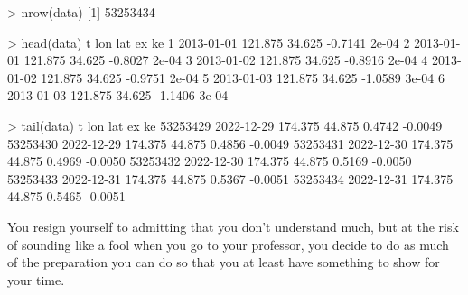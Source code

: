 \documentclass[
  10t,
]{article}
\newenvironment{Shaded}{\begin{snugshade}}{\end{snugshade}}
\newcommand{\DecValTok}[1]{\textcolor[rgb]{0.68,0.00,0.00}{#1}}
\newcommand{\FloatTok}[1]{\textcolor[rgb]{0.68,0.00,0.00}{#1}}
\newcommand{\FunctionTok}[1]{\textcolor[rgb]{0.28,0.35,0.67}{#1}}
\newcommand{\NormalTok}[1]{\textcolor[rgb]{0.00,0.23,0.31}{#1}}
\newcommand{\SpecialCharTok}[1]{\textcolor[rgb]{0.37,0.37,0.37}{#1}}
\begin{document}
\begin{Shaded}
\begin{Highlighting}[]
\SpecialCharTok{\textgreater{}} \FunctionTok{nrow}\NormalTok{(data)}
\NormalTok{[}\DecValTok{1}\NormalTok{] }\DecValTok{53253434}

\SpecialCharTok{\textgreater{}} \FunctionTok{head}\NormalTok{(data)}
\NormalTok{           t     lon    lat      ex    ke}
\DecValTok{1} \DecValTok{2013{-}01{-}01} \FloatTok{121.875} \FloatTok{34.625} \SpecialCharTok{{-}}\FloatTok{0.7141} \FloatTok{2e{-}04}
\DecValTok{2} \DecValTok{2013{-}01{-}01} \FloatTok{121.875} \FloatTok{34.625} \SpecialCharTok{{-}}\FloatTok{0.8027} \FloatTok{2e{-}04}
\DecValTok{3} \DecValTok{2013{-}01{-}02} \FloatTok{121.875} \FloatTok{34.625} \SpecialCharTok{{-}}\FloatTok{0.8916} \FloatTok{2e{-}04}
\DecValTok{4} \DecValTok{2013{-}01{-}02} \FloatTok{121.875} \FloatTok{34.625} \SpecialCharTok{{-}}\FloatTok{0.9751} \FloatTok{2e{-}04}
\DecValTok{5} \DecValTok{2013{-}01{-}03} \FloatTok{121.875} \FloatTok{34.625} \SpecialCharTok{{-}}\FloatTok{1.0589} \FloatTok{3e{-}04}
\DecValTok{6} \DecValTok{2013{-}01{-}03} \FloatTok{121.875} \FloatTok{34.625} \SpecialCharTok{{-}}\FloatTok{1.1406} \FloatTok{3e{-}04}

\SpecialCharTok{\textgreater{}} \FunctionTok{tail}\NormalTok{(data)}
\NormalTok{                  t     lon    lat     ex      ke}
\DecValTok{53253429} \DecValTok{2022{-}12{-}29} \FloatTok{174.375} \FloatTok{44.875} \FloatTok{0.4742} \SpecialCharTok{{-}}\FloatTok{0.0049}
\DecValTok{53253430} \DecValTok{2022{-}12{-}29} \FloatTok{174.375} \FloatTok{44.875} \FloatTok{0.4856} \SpecialCharTok{{-}}\FloatTok{0.0049}
\DecValTok{53253431} \DecValTok{2022{-}12{-}30} \FloatTok{174.375} \FloatTok{44.875} \FloatTok{0.4969} \SpecialCharTok{{-}}\FloatTok{0.0050}
\DecValTok{53253432} \DecValTok{2022{-}12{-}30} \FloatTok{174.375} \FloatTok{44.875} \FloatTok{0.5169} \SpecialCharTok{{-}}\FloatTok{0.0050}
\DecValTok{53253433} \DecValTok{2022{-}12{-}31} \FloatTok{174.375} \FloatTok{44.875} \FloatTok{0.5367} \SpecialCharTok{{-}}\FloatTok{0.0051}
\DecValTok{53253434} \DecValTok{2022{-}12{-}31} \FloatTok{174.375} \FloatTok{44.875} \FloatTok{0.5465} \SpecialCharTok{{-}}\FloatTok{0.0051}
\end{Highlighting}
\end{Shaded}

You resign yourself to admitting that you don't understand much, but at
the risk of sounding like a fool when you go to your professor, you
decide to do as much of the preparation you can do so that you at least
have something to show for your time.
\end{document}
